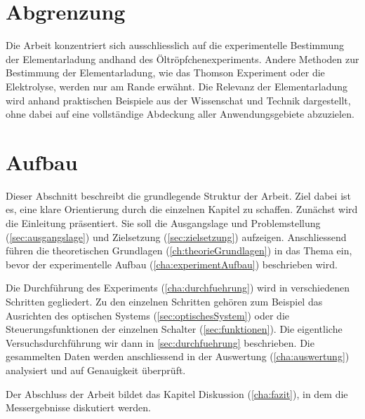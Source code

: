 \section{Abgrenzung}
Die Arbeit konzentriert sich ausschliesslich auf die experimentelle Bestimmung der Elementarladung andhand des Öltröpfchenexperiments. Andere Methoden zur Bestimmung der Elementarladung, wie das Thomson Experiment oder die Elektrolyse, werden nur am Rande erwähnt. Die Relevanz der Elementarladung wird anhand praktischen Beispiele aus der Wissenschat und Technik dargestellt, ohne dabei auf eine vollständige Abdeckung aller Anwendungsgebiete abzuzielen.

\section{Aufbau}
Dieser Abschnitt beschreibt die grundlegende Struktur der Arbeit. Ziel dabei ist es, eine klare Orientierung durch die einzelnen Kapitel zu schaffen. Zunächst wird die Einleitung präsentiert. Sie soll die Ausgangslage und Problemstellung (\autoref{sec:ausgangslage}) und Zielsetzung (\autoref{sec:zielsetzung}) aufzeigen. Anschliessend führen die theoretischen Grundlagen (\autoref{ch:theorieGrundlagen}) in das Thema ein, bevor der experimentelle Aufbau (\autoref{cha:experimentAufbau}) beschrieben wird.

Die Durchführung des Experiments (\autoref{cha:durchfuehrung}) wird in verschiedenen Schritten gegliedert. Zu den einzelnen Schritten gehören zum Beispiel das Ausrichten des optischen Systems (\autoref{sec:optischesSystem}) oder die Steuerungsfunktionen der einzelnen Schalter (\autoref{sec:funktionen}). Die eigentliche Versuchsdurchführung wir dann in \autoref{sec:durchfuehrung} beschrieben. Die gesammelten Daten werden anschliessend in der Auswertung (\autoref{cha:auswertung}) analysiert und auf Genauigkeit überprüft.

Der Abschluss der Arbeit bildet das Kapitel Diskussion (\autoref{cha:fazit}), in dem die Messergebnisse diskutiert werden.